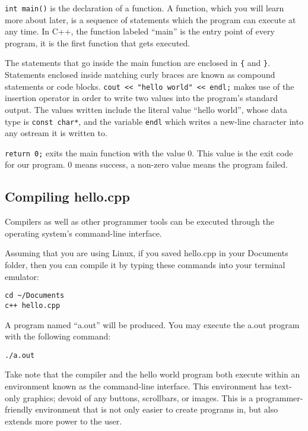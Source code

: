 \documentclass[a4paper,12pt]{article}
\begin{document}
\texttt{int main()} is the declaration of a function. A function, which you will learn more about later, is a sequence of statements which the program can execute at any time. In C++, the function labeled ``main'' is the entry point of every program, it is the first function that gets executed. 

The statements that go inside the main function are enclosed in \texttt{\{} and \texttt{\}}. Statements enclosed inside matching curly braces are known as compound statements or code blocks. 
\texttt{cout << "hello world" << endl;} makes use of the insertion operator in order to write two values into the program's standard output. The values written include the literal value ``hello world'', whose data type is \texttt{const char*}, and the variable \texttt{endl} which writes a new-line character into any ostream it is written to.

\texttt{return 0;} exits the main function with the value 0. This value is the exit code for our program. 0 means success, a non-zero value means the program failed.

\subsection*{Compiling hello.cpp}

Compilers as well as other programmer tools can be executed through the operating system's command-line interface. 

Assuming that you are using Linux, if you saved hello.cpp in your Documents folder, then you can compile it by typing these commands into your terminal emulator:
\begin{lstlisting}
cd ~/Documents
c++ hello.cpp
\end{lstlisting}
A program named ``a.out'' will be produced.  You may execute the a.out program with the following command:
\begin{lstlisting}
./a.out
\end{lstlisting}

Take note that the compiler and the hello world program both execute within an environment known as the command-line interface. This environment has text-only graphics; devoid of any buttons, scrollbars, or images. This is a programmer-friendly environment that is not only easier to create programs in, but also extends more power to the user. 
\end{document}
